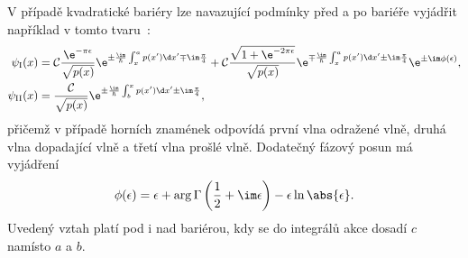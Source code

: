 	V případě kvadratické bariéry lze navazující podmínky před a po bariéře vyjádřit například v tomto tvaru~\cite{Berry1972}:
    \begin{subequations}
        \begin{align}
            \psi_{\mathrm{I}}(x)
                &=\mathcal{C}\frac{\e^{-\pi\epsilon}}{\sqrt{p(x)}}
                \e^{\pm\frac{\im}{\hbar}\int_{x}^{a}p(x')\d x'\mp\im\frac{\pi}{4}}
                +\mathcal{C}\frac{\sqrt{1+\e^{-2\pi\epsilon}}}{\sqrt{p(x)}}
                \e^{\mp\frac{\im}{\hbar}\int_{x}^{a}p(x')\d x'\pm\im\frac{\pi}{4}}\e^{\pm\im\phi(\epsilon)},\\
            \psi_{\mathrm{II}}(x)
                &=\frac{\mathcal{C}}{\sqrt{p(x)}}
                \e^{\pm\frac{\im}{\hbar}\int_{b}^{x}p(x')\d x'\pm\im\frac{\pi}{4}},
        \end{align}            
    \end{subequations}
	přičemž v případě horních znamének odpovídá první vlna odražené vlně, druhá vlna dopadající vlně a třetí vlna prošlé vlně.
	Dodatečný fázový posun má vyjádření
	\begin{equation}
		\phi(\epsilon)=\epsilon+\arg\Gamma\left(\frac{1}{2}+\im\epsilon\right)-\epsilon\ln\abs{\epsilon}.
	\end{equation}
	Uvedený vztah platí pod i nad bariérou, kdy se do integrálů akce dosadí $c$ namísto $a$ a $b$.
    
